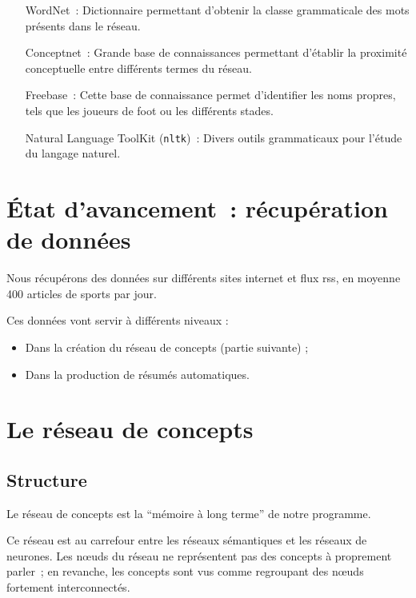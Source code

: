 \documentclass[a4paper,12pt]{article}
\newcommand{\pyt}[1]{\texttt{#1}}
\begin{document}
\begin{itemize}
	\item[WordNet~: ]Dictionnaire permettant d'obtenir la classe grammaticale des mots présents dans le réseau.
	\item[Conceptnet~: ]Grande base de connaissances permettant d'établir la proximité conceptuelle entre différents termes du réseau.
	\item[Freebase~: ]Cette base de connaissance permet d'identifier les noms propres, tels que les joueurs de foot ou les différents stades.
	\item[Natural Language ToolKit (\pyt{nltk})~: ]Divers outils grammaticaux pour l'étude du langage naturel.
\end{itemize}

\section{\'Etat d'avancement~: r\'ecup\'eration de donn\'ees}

Nous r\'ecup\'erons des donn\'ees sur diff\'erents sites internet et flux rss, en moyenne 400 articles de sports par jour.

Ces donn\'ees vont servir \`a diff\'erents niveaux :
\begin{itemize}
 \item Dans la cr\'eation du r\'eseau de concepts (partie suivante) ;
 \item Dans la production de r\'esum\'es automatiques.
\end{itemize}


\section{Le r\'eseau de concepts}


\subsection{Structure}


\begin{definition}
Le réseau de concepts est la ``mémoire à long terme'' de notre programme.

Ce réseau est au carrefour entre les réseaux sémantiques et les réseaux de neurones. Les n\oe{}uds du réseau ne représentent pas des concepts à proprement parler~; en revanche, les concepts sont vus comme regroupant des n\oe{}uds fortement interconnectés.
\end{definition}
\end{document}
